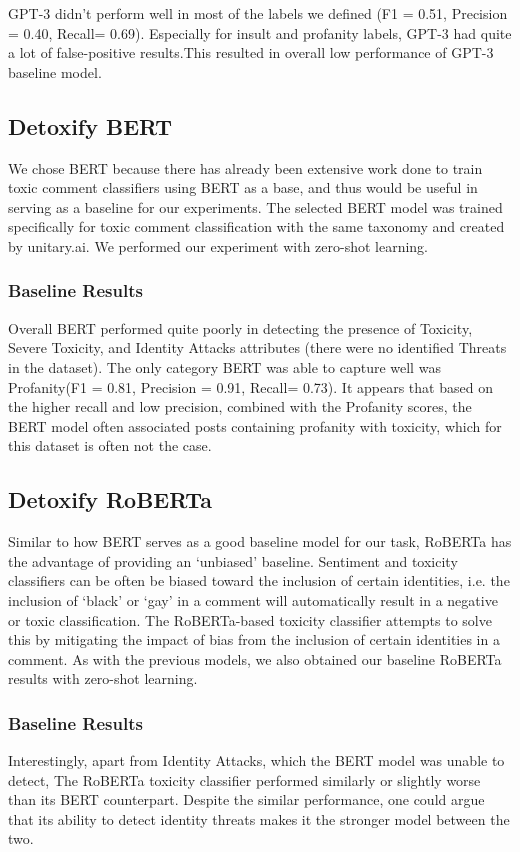 \documentclass[11pt]{article}
\begin{document}
GPT-3 didn’t perform well in most of the labels we defined (F1 = 0.51, Precision =  0.40, Recall= 0.69). Especially for insult and profanity labels, GPT-3 had quite a lot of false-positive results.This resulted in overall low performance of GPT-3 baseline model. 

\subsection{Detoxify BERT}
We chose BERT because there has already been extensive work done to train toxic comment classifiers using BERT as a base, and thus would be useful in serving as a baseline for our experiments.  The selected BERT model was trained specifically for toxic comment classification with the same taxonomy and created by unitary.ai. We performed our experiment with zero-shot learning.

\subsubsection{Baseline Results}
Overall BERT performed quite poorly in detecting the presence of Toxicity, Severe Toxicity, and Identity Attacks attributes (there were no identified Threats in the dataset).  The only category BERT was able to capture well was Profanity(F1 = 0.81, Precision =  0.91, Recall= 0.73). It appears that based on the higher recall and low precision, combined with the Profanity scores, the BERT model often associated posts containing profanity with toxicity, which for this dataset is often not the case.

\subsection{Detoxify RoBERTa}
Similar to how BERT serves as a good baseline model for our task, RoBERTa has the advantage of providing an ‘unbiased’ baseline.  Sentiment and toxicity classifiers can be often be biased toward the inclusion of certain identities, i.e. the inclusion of ‘black’ or ‘gay’ in a comment will automatically result in a negative or toxic classification.  The RoBERTa-based toxicity classifier attempts to solve this by mitigating the impact of bias from the inclusion of certain identities in a comment.  As with the previous models, we also obtained our baseline RoBERTa results with zero-shot learning.

\subsubsection{Baseline Results}
Interestingly, apart from Identity Attacks, which the BERT model was unable to detect, The RoBERTa toxicity classifier performed similarly or slightly worse than its BERT counterpart.  Despite the similar performance, one could argue that its ability to detect identity threats makes it the stronger model between the two.
\end{document}
